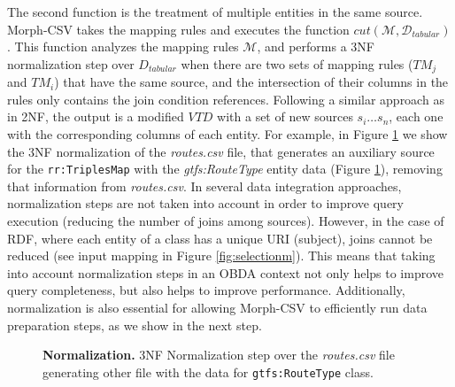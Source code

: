The second function is the treatment of multiple entities in the same source. Morph-CSV takes the mapping rules and executes the function $cut(\mathcal{M},\mathcal{D}_{tabular})$. This function analyzes the mapping rules $\mathcal{M}$, and performs a 3NF~\citep{codd1979extending} normalization step over ${D}_{tabular}$ when there are two sets of mapping rules ($TM_j$ and $TM_i$) that have the same source, and the intersection of their columns in the rules only contains the join condition references. Following a similar approach as in 2NF, the output is a modified $VTD$ with a set of new sources $s_i\ldots s_n$, each one with the corresponding columns of each entity. For example, in Figure \ref{fig:normalization} we show the 3NF normalization of the \textit{routes.csv} file, that generates an auxiliary source for the \texttt{rr:TriplesMap} with the \textit{gtfs:RouteType} entity data (Figure \ref{fig:normalization}), removing that information from \textit{routes.csv}. In several data integration approaches, normalization steps are not taken into account in order to improve query execution (reducing the number of joins among sources). However, in the case of RDF, where each entity of a class has a unique URI (subject), joins cannot be reduced (see input mapping in Figure \ref{fig:selectionm}). This means that taking into account normalization steps in an OBDA context not only helps to improve query completeness, but also helps to improve performance. Additionally, normalization is also essential for allowing Morph-CSV to efficiently run data preparation steps, as we show in the next step.

\begin{figure}[ht]
\centering
{}
\caption[Normalization step]{\textbf{Normalization.} 3NF Normalization step over the \textit{routes.csv} file generating other file with the data for \texttt{gtfs:RouteType} class.}
\label{fig:normalization}
\end{figure}

